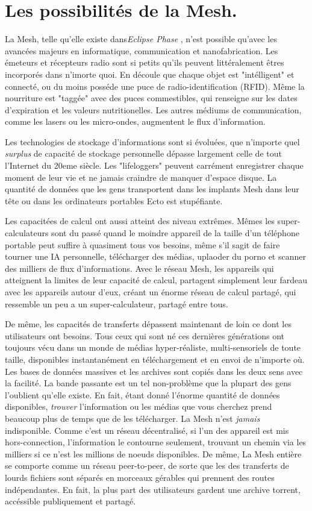 \section{Les possibilités de la  Mesh.} 

La Mesh, telle qu'elle existe dans\textit{Eclipse Phase} , n'est possible qu'avec les avancées majeurs en informatique, communication et nanofabrication. Les émeteurs et récepteurs radio sont si petits qu'ils peuvent littéralement êtres incorporés dans n'imorte quoi. En découle que chaque objet est "intélligent" et connecté, ou du moins posséde une puce de radio-identification (RFID). Même la nourriture est "taggée" avec des puces commestibles, qui renseigne sur les dates d'expiration et les valeurs nutritionelles. Les autres médiums de communication, comme les lasers ou les micro-ondes, augmentent le flux d'information. 

Les technologies de stockage d'informations sont si évoluées, que n'importe quel \textit{surplus} de capacité de stockage personnelle dépasse largement celle de tout l'Internet du 20eme siècle. Les "lifeloggers" peuvent carrément enregistrer chaque moment de leur vie et ne jamais craindre de manquer d'espace disque. La quantité de données que les gens transportent dans les implants Mesh dans leur tête ou dans les ordinateurs portables Ecto est stupéfiante. 

Les capacitées de calcul ont aussi atteint des niveau extrêmes. Mêmes les super-calculateurs sont du passé quand le moindre appareil de la taille d'un téléphone portable peut suffire à quasiment tous vos besoins, même s'il sagit de faire tourner une IA personnelle, télécharger des médias, uplaoder du porno et scanner des milliers de flux d'informations. Avec le réseau Mesh, les appareils qui atteignent la limites de leur capacité de calcul, partagent simplement leur fardeau avec les appareils autour d'eux, créant un énorme réseau de calcul partagé, qui ressemble un peu a un super-calculateur, partagé entre tous. 

De même, les capacités de transferts dépassent maintenant de loin ce dont les utilisateurs ont besoins. Tous ceux qui sont né ces dernières générations ont toujours vécu dans un monde de médias hyper-réaliste, multi-sensoriels de toute taille, disponibles instantanément en téléchargement et en envoi de n'importe où. Les bases de données massives et les archives sont copiés dans les deux sens avec la facilité. La bande passante est un tel non-problème que la plupart des gens l'oublient qu'elle existe. En fait, étant donné l'énorme quantité de données disponibles, \textit{trouver } l'information ou les médias que vous cherchez prend beaucoup plus de temps que de les télécharger. La Mesh n'est \textit{jamais } indisponible. Comme c'est un réseau décentralisé, si l'un des appareil est mis hors-connection, l'information le contourne seulement, trouvant un chemin via les milliers si ce n'est les millions de noeuds disponibles. De même, La Mesh entière se comporte comme un réseau peer-to-peer, de sorte que les des transferts de lourds fichiers sont séparés en morceaux gérables qui prennent des routes indépendantes. En fait, la plus part des utilisateurs gardent une archive torrent, accéssible publiquement et partagé.  

